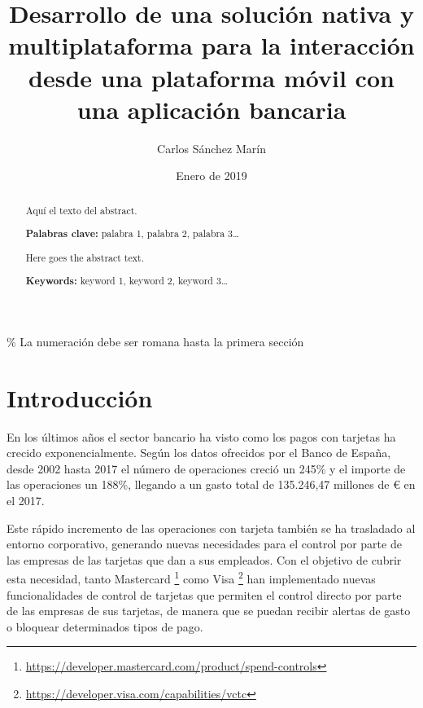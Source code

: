 \documentclass[a4paper, 12pt]{article}
\author{Carlos Sánchez Marín}
\date{Enero de 2019}
\title{Desarrollo de una solución nativa y multiplataforma para la interacción desde una plataforma móvil con una aplicación bancaria}
\begin{document}
\maketitle
\begin{export}
\null
\newpage

 \% La numeración debe ser romana hasta la primera sección
\tableofcontents
\newpage

\listoffigures
\listoftables
\newpage
\end{export}

\begin{abstract}
\normalsize
Aquí el texto del abstract.

\textbf{Palabras clave:} palabra 1, palabra 2, palabra 3\ldots{}
\end{abstract}

\begin{otherlanguage}{english}
\begin{abstract}
\normalsize
Here goes the abstract text.

\textbf{Keywords:} keyword 1, keyword 2, keyword 3\ldots
\end{abstract}
\end{otherlanguage}

\newpage
{}%

\section{Introducción}
\label{sec-1}
En los últimos años el sector bancario ha visto como los pagos con tarjetas ha crecido exponencialmente.
Según los datos ofrecidos por el Banco de España, desde 2002 hasta 2017 el número de operaciones creció
un 245\% y el importe de las operaciones un 188\%, llegando a un gasto total de 135.246,47 millones de €
en el 2017\cite{BancoEspana}.

Este rápido incremento de las operaciones con tarjeta también se ha trasladado al entorno corporativo,
generando nuevas necesidades para el control por parte de las empresas de las tarjetas que dan a sus
empleados. Con el objetivo de cubrir esta necesidad, tanto Mastercard \footnote{\url{https://developer.mastercard.com/product/spend-controls}} como Visa \footnote{\url{https://developer.visa.com/capabilities/vctc}} han
implementado nuevas funcionalidades de control de tarjetas que permiten el control directo por parte
de las empresas de sus tarjetas, de manera que se puedan recibir alertas de gasto o bloquear determinados tipos de pago.
\end{document}
